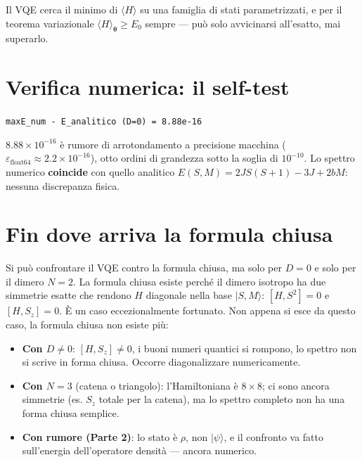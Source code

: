 \documentclass[11pt,a4paper]{article}
\begin{document}
Il VQE cerca il minimo di $\langle H\rangle$ su una famiglia di stati
parametrizzati, e per il teorema variazionale
$\langle H\rangle_{\boldsymbol\theta} \geq E_0$ sempre --- può solo
avvicinarsi all'esatto, mai superarlo.

\section*{Verifica numerica: il self-test}

\begin{testbox}
\texttt{max\textbar{}E\_num - E\_analitico\textbar{} (D=0) = 8.88e-16}
\end{testbox}

$8.88 \times 10^{-16}$ è rumore di arrotondamento a precisione macchina
($\varepsilon_{\text{float64}} \approx 2.2 \times 10^{-16}$), otto ordini
di grandezza sotto la soglia di $10^{-10}$. Lo spettro numerico
\textbf{coincide} con quello analitico $E(S,M) = 2JS(S+1) - 3J + 2bM$:
nessuna discrepanza fisica.

\section*{Fin dove arriva la formula chiusa}

Si può confrontare il VQE contro la formula chiusa, ma solo per $D=0$ e
solo per il dimero $N=2$. La formula chiusa esiste perché il dimero
isotropo ha due simmetrie esatte che rendono $H$ diagonale nella base
$|S,M\rangle$: $[H,S^2]=0$ e $[H,S_z]=0$. È un caso eccezionalmente
fortunato. Non appena si esce da questo caso, la formula chiusa non
esiste più:

\begin{itemize}[leftmargin=1.4em, itemsep=0.15em]
\item \textbf{Con $D\neq0$}: $[H,S_z]\neq0$, i buoni numeri quantici si
rompono, lo spettro non si scrive in forma chiusa. Occorre diagonalizzare
numericamente.
\item \textbf{Con $N=3$} (catena o triangolo): l'Hamiltoniana è
$8\times8$; ci sono ancora simmetrie (es. $S_z$ totale per la catena), ma
lo spettro completo non ha una forma chiusa semplice.
\item \textbf{Con rumore (Parte 2)}: lo stato è $\rho$, non $|\psi\rangle$,
e il confronto va fatto sull'energia dell'operatore densità --- ancora
numerico.
\end{itemize}
\end{document}
